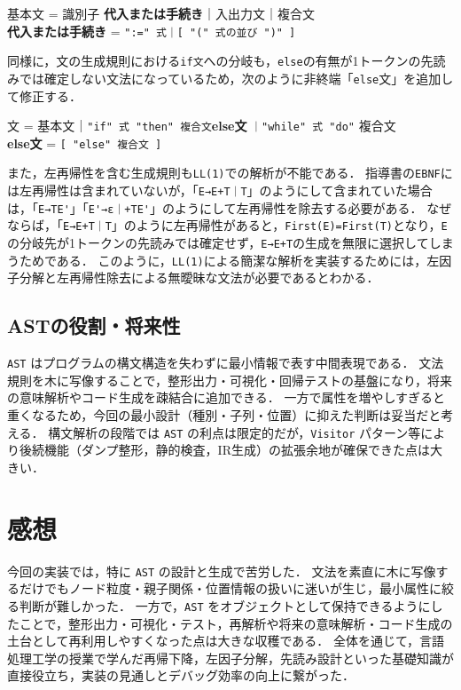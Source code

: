 \documentclass[a4j,10pt]{jarticle}
\begin{document}
\begin{mdframed}[roundcorner=4pt, linewidth=0.6pt, innertopmargin=4pt, innerbottommargin=4pt, innerleftmargin=20pt]
基本文 = 識別子 \textbf{代入または手続き}｜入出力文｜複合文\\
\textbf{代入または手続き} = \verb|":=" 式｜[ "(" 式の並び ")" ]|
\end{mdframed}

同様に，文の生成規則における\verb|if文|への分岐も，\verb|else|の有無が1トークンの先読みでは確定しない文法になっているため，次のように非終端「\verb|else|文」を追加して修正する．
\begin{mdframed}[roundcorner=4pt, linewidth=0.6pt, innertopmargin=4pt, innerbottommargin=4pt, innerleftmargin=20pt]
文 = 基本文｜\verb|"if" 式 "then" 複合文|\hspace{8pt}\textbf{else文} \verb|｜"while" 式 "do"| 複合文\\
\textbf{else文} = \verb|[ "else" 複合文 ]|
\end{mdframed}

また，左再帰性を含む生成規則も\verb|LL(1)|での解析が不能である．
指導書の\verb|EBNF|には左再帰性は含まれていないが，「\verb|E→E+T｜T|」のようにして含まれていた場合は，「\verb|E→TE'|」「\verb|E'→ε｜+TE'|」のようにして左再帰性を除去する必要がある．
なぜならば，「\verb|E→E+T｜T|」のように左再帰性があると，\verb|First(E)=First(T)|となり，\verb|E|の分岐先が1トークンの先読みでは確定せず，\verb|E→E+T|の生成を無限に選択してしまうためである．
このように，\verb|LL(1)|による簡潔な解析を実装するためには，左因子分解と左再帰性除去による無曖昧な文法が必要であるとわかる．

\subsection{ASTの役割・将来性}
\verb|AST| はプログラムの構文構造を失わずに最小情報で表す中間表現である．
文法規則を木に写像することで，整形出力・可視化・回帰テストの基盤になり，将来の意味解析やコード生成を疎結合に追加できる．
一方で属性を増やしすぎると重くなるため，今回の最小設計（種別・子列・位置）に抑えた判断は妥当だと考える．
構文解析の段階では \verb|AST| の利点は限定的だが，\verb|Visitor| パターン等により後続機能（ダンプ整形，静的検査，IR生成）の拡張余地が確保できた点は大きい．


\section{感想}
今回の実装では，特に \verb|AST| の設計と生成で苦労した．
文法を素直に木に写像するだけでもノード粒度・親子関係・位置情報の扱いに迷いが生じ，最小属性に絞る判断が難しかった．
一方で，\verb|AST| をオブジェクトとして保持できるようにしたことで，整形出力・可視化・テスト，再解析や将来の意味解析・コード生成の土台として再利用しやすくなった点は大きな収穫である．
全体を通じて，言語処理工学の授業で学んだ再帰下降，左因子分解，先読み設計といった基礎知識が直接役立ち，実装の見通しとデバッグ効率の向上に繋がった．
\end{document}

